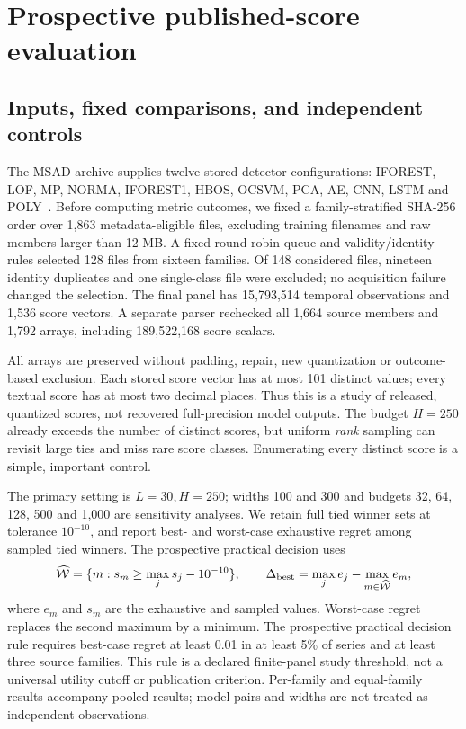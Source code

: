 \section{Prospective published-score evaluation}
\label{sec:new-evaluation}
\subsection{Inputs, fixed comparisons, and independent controls}
The MSAD archive supplies twelve stored detector configurations:
IFOREST, LOF, MP, NORMA, IFOREST1, HBOS, OCSVM, PCA, AE, CNN, LSTM and
POLY~\citep{msad2023}. Before computing metric outcomes, we fixed a
family-stratified SHA-256 order over 1,863 metadata-eligible files,
excluding training filenames and raw members larger than 12 MB. A fixed
round-robin queue and validity/identity rules selected 128 files from
sixteen families. Of 148 considered files, nineteen identity duplicates
and one single-class file were excluded; no acquisition failure changed
the selection. The final panel has 15,793,514 temporal observations and
1,536 score vectors. A separate parser rechecked all 1,664 source members
and 1,792 arrays, including 189,522,168 score scalars.

All arrays are preserved without padding, repair, new quantization or
outcome-based exclusion. Each stored score vector has at most 101 distinct
values; every textual score has at most two decimal places. Thus this is
a study of released, quantized scores, not recovered full-precision model
outputs. The budget $H=250$ already exceeds the number of distinct scores,
but uniform \emph{rank} sampling can revisit large ties and miss rare score
classes. Enumerating every distinct score is a simple, important control.

The primary setting is $L=30,H=250$; widths 100 and 300 and budgets
32, 64, 128, 500 and 1,000 are sensitivity analyses. We retain full tied
winner sets at tolerance $10^{-10}$, and report best- and worst-case
exhaustive regret among sampled tied winners. The prospective practical
decision uses
\[
 \widehat{\mathcal W}=\{m:s_m\geq\max_j s_j-10^{-10}\},\qquad
 \Delta_{\rm best}=\max_j e_j-\max_{m\in\widehat{\mathcal W}}e_m,
\]
where $e_m$ and $s_m$ are the exhaustive and sampled values. Worst-case
regret replaces the second maximum by a minimum. The prospective practical
decision rule requires best-case regret at least 0.01 in at least 5\%
of series and at least three source families. This rule is a declared
finite-panel study threshold, not a universal utility cutoff or publication
criterion. Per-family and equal-family results accompany pooled results;
model pairs and widths are not treated as independent observations.

